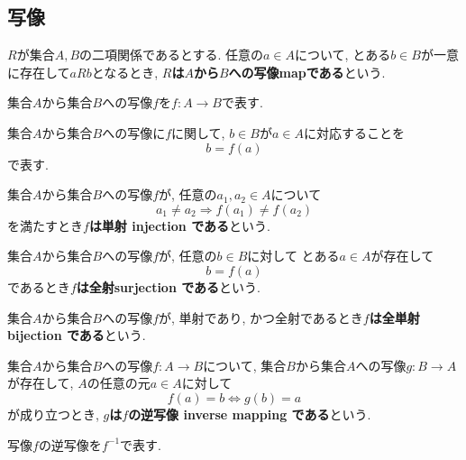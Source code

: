 \subsection{写像}
\begin{Def}
$R$が集合$A,B$の二項関係であるとする.
任意の$a\in A$について, とある$b\in B$が一意に存在して$aRb$となるとき,
{\bf $R$は$A$から$B$への写像mapである}という.
\end{Def}
\begin{Notation}
集合$A$から集合$B$への写像$f$を$f:A\rightarrow B$で表す.
\end{Notation}
\begin{comment}
\begin{caution}
以下では, 「{\bf 関数 function\index{かんすう@関数}}」と「写像」を同じ意味で用いる.
\end{caution}
\end{comment}
\begin{Notation}
集合$A$から集合$B$への写像に$f$に関して, $b\in B$が$a\in A$に対応することを
\[
b=f(a)
\]
で表す.
\end{Notation}
\begin{Def}
集合$A$から集合$B$への写像$f$が,
任意の$a_1,a_2\in A$について
\[
a_1\neq a_2\Rightarrow f(a_1)\neq f(a_2)
\]
を満たすとき{\bf $f$は単射 injection である}という.
\end{Def}
\begin{Def}
集合$A$から集合$B$への写像$f$が,
任意の$b\in B$に対して
とある$a\in A$が存在して
\[
b=f(a)
\]
であるとき{\bf $f$は全射surjection である}という.
\end{Def}
\begin{Def}
集合$A$から集合$B$への写像$f$が, 単射であり, かつ全射であるとき{\bf $f$は全単射 bijection である}という.
\end{Def}

\begin{Def}
集合$A$から集合$B$への写像$f:A\rightarrow B$について, 集合$B$から集合$A$への写像$g:B\rightarrow A$が存在して, $A$の任意の元$a\in A$に対して
\[
f(a)=b \Leftrightarrow g(b)=a
\]
が成り立つとき, {\bf $g$は$f$の逆写像 inverse mapping である}という.
\end{Def}
\begin{Notation}
写像$f$の逆写像を$f^{-1}$で表す.
\end{Notation}
\begin{comment}
************************************
\begin{Def}
$R$が集合$A,B$の二項関係であるとする.

任意の$a\in A$について$b,b'\in B$が存在し,
\[
aRb\land aRb'\Rightarrow b=b'
\]
が成り立つとき, {\bf $R$は$A$から$B$への部分関数\index{ぶぶんかんすう@部分関数}}という.\footnote{ここいらない気がする}
\end{Def}
\begin{Prop}
関数は部分関数である. これは定義より明らかである.
\end{Prop}
\begin{Prop}
部分関数は二項関係である. これは定義より明らかである.
\end{Prop}
************************************
\end{comment}

